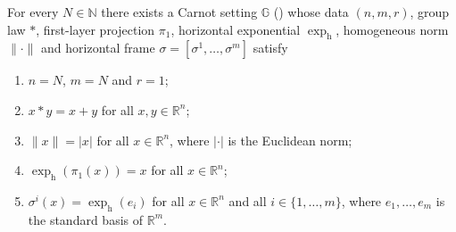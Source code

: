 \begin{theorem}
For every $N\in\mathbb N$ there exists a Carnot setting $\mathbb G$ ()
whose data $(n,m,r)$, group law $*$, first-layer projection $\pi_1$, horizontal exponential
$\exp_{\mathrm h}$, homogeneous norm $\|\cdot\|$ and horizontal frame
$\sigma=[\sigma^1,\ldots,\sigma^m]$ satisfy
\begin{enumerate}
\item $n=N$, $m=N$ and $r=1$;
\item $x*y=x+y$ for all $x,y\in\mathbb R^{n}$;
\item $\|x\|=|x|$ for all $x\in\mathbb R^{n}$, where $|\cdot|$ is the Euclidean norm;
\item $\exp_{\mathrm h}(\pi_1(x))=x$ for all $x\in\mathbb R^{n}$;
\item $\sigma^i(x)=\exp_{\mathrm h}(e_i)$ for all $x\in\mathbb R^{n}$ and all
  $i\in\{1,\ldots,m\}$, where $e_1,\ldots,e_m$ is the standard basis of $\mathbb R^{m}$.
\end{enumerate}
\end{theorem}
